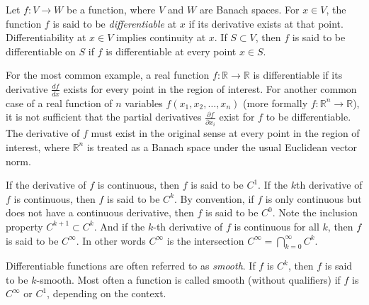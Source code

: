 \documentclass[12pt]{article}
\newcommand{\R}{\mathbb{R}}
\begin{document}
Let $f\colon V\to W$ be a function, where $V$ and $W$ are Banach spaces.
For $x\in V$, the function $f$ is said to be \emph{differentiable}
at $x$ if its derivative exists at that point. Differentiability at
$x\in V$ implies continuity at $x$. If $S\subset V$, then $f$ is said to
be differentiable on $S$ if $f$ is differentiable at every point $x\in S$.

For the most common example, a real function $f\colon\R\to\R$ is differentiable
if its derivative $\frac{df}{dx}$ exists for every point in the region of
interest. For another common case of a real function of $n$ variables
$f(x_1,x_2,\ldots,x_n)$ (more formally $f\colon\R^n\to\R$),
it is not sufficient that the partial derivatives
$\frac{\partial f}{\partial x_i}$ exist for $f$ to be differentiable. The
derivative of $f$ must exist in the original sense
at every point in the region of interest,
where $\R^n$ is treated as a Banach space under the usual Euclidean vector
norm.

If the derivative of $f$ is continuous, then $f$ is said to be $C^1$. If
the $k$th derivative of $f$ is continuous, then $f$ is said to be $C^k$. By convention, if $f$
is only continuous but does not have a continuous derivative, then $f$ is said to
be $C^0$. Note the inclusion property $C^{k+1} \subset C^k$.
And if the $k$-th derivative of $f$ is continuous for all $k$,
then $f$ is said to be $C^\infty$. In other words $C^\infty$ is the
intersection $C^\infty = \bigcap_{k=0}^\infty C^k$.

Differentiable functions are often referred to as {\em smooth}. If $f$ is
$C^k$, then $f$ is said to be $k$-smooth. Most often a function is called
smooth (without qualifiers) if $f$ is $C^\infty$ or $C^1$, depending on the
context.
\end{document}
